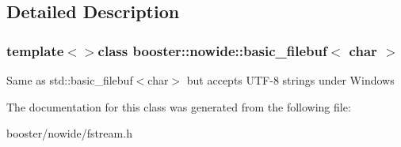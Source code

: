 \subsection{Detailed Description}
\subsubsection*{template$<$$>$class booster\-::nowide\-::basic\-\_\-filebuf$<$ char $>$}

Same as std\-::basic\-\_\-filebuf$<$char$>$ but accepts U\-T\-F-\/8 strings under Windows 

The documentation for this class was generated from the following file\-:\begin{DoxyCompactItemize}
\item 
booster/nowide/fstream.\-h\end{DoxyCompactItemize}
